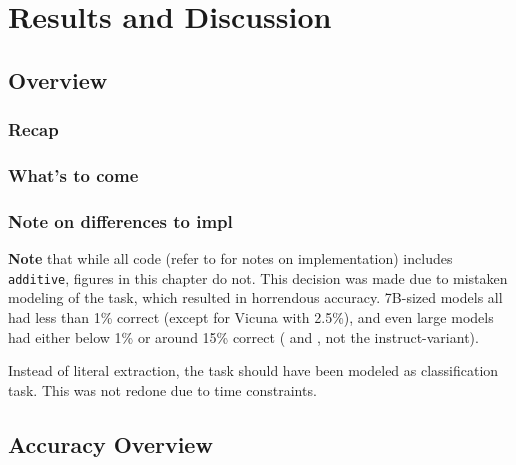\chapter{Results and Discussion}\label{chap:results}
\section{Overview}
\subsection{Recap}

\subsection{What's to come}

\subsection{Note on differences to impl}
\textbf{Note} that while all code (refer to  for notes on implementation) includes \texttt{additive}, figures in this chapter do not.
This decision was made due to mistaken modeling of the task, which resulted in horrendous accuracy.
7B-sized models all had less than 1\% correct (except for Vicuna with 2.5\%), and even large models had either below 1\% or around 15\% correct ( and , not the instruct-variant).

Instead of literal extraction, the task should have been modeled as classification task.
This was not redone due to time constraints.








\section{Accuracy Overview}\label{sec:result:first}

